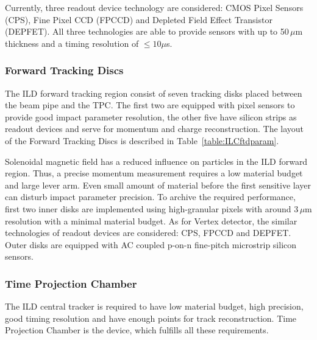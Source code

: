 Currently, three readout device technology are considered: CMOS Pixel Sensors (CPS), Fine Pixel CCD (FPCCD) and Depleted Field Effect Transistor (DEPFET).
All three technologies are able to provide sensors with up to 50\,$\mu$m thickness and a timing resolution of $\leq 10\mu$s. 


\subsubsection{Forward Tracking Discs}

The ILD forward tracking region consist of seven tracking disks placed between the beam pipe and the TPC. The first two are equipped with pixel sensors to provide good impact parameter resolution, the other five have silicon strips as readout devices and serve for momentum and charge reconstruction. The layout of the Forward Tracking Discs is described in Table~\ref{table:ILCftdparam}. 



Solenoidal magnetic field has a reduced influence on particles in the ILD forward region.
Thus, a precise momentum measurement requires a low material budget and large lever arm. Even small amount of material before the first sensitive layer can disturb impact parameter precision. To archive the required performance, first two inner disks are implemented using high-granular pixels with around 3\,$\mu$m resolution with a minimal material budget. As for Vertex detector, the similar technologies of readout devices are considered: CPS, FPCCD and DEPFET. Outer disks are equipped with AC coupled p-on-n fine-pitch microstrip silicon sensors.

\subsubsection{Time Projection Chamber}

The ILD central tracker is required to have low material budget, high precision, good timing resolution and have enough points for track reconstruction. Time Projection Chamber is the device, which fulfills all these requirements. 

